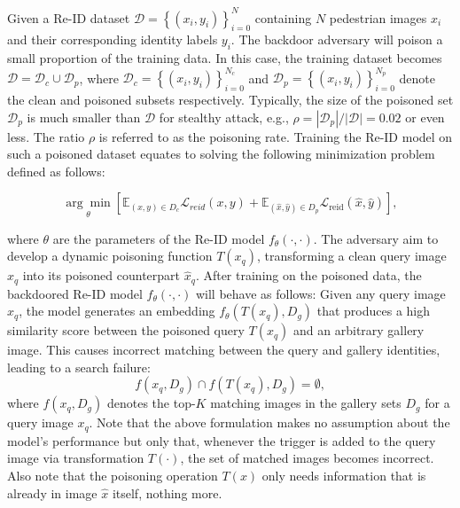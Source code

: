 \documentclass[sigconf,authordraft]{acmart}
\begin{document}
Given a Re-ID dataset $\mathcal{D}=\left\{\left(x_i, y_i\right)\right\}_{i=0}^{N}$ containing $N$ pedestrian images $x_i$ and their corresponding identity labels $y_i$. The backdoor adversary will poison a small proportion of the training data. In this case, the training dataset becomes $\mathcal{D} = \mathcal{D}_c \cup \mathcal{D}_p$, where $\mathcal{D}_c=\left\{\left(x_i, y_i\right)\right\}_{i=0}^{N_c}$ and $\mathcal{D}_p=\left\{\left(x_i, y_i\right)\right\}_{i=0}^{N_p}$ denote the clean and poisoned subsets respectively. Typically, the size of the poisoned set $\mathcal{D}_p$ is much smaller than $\mathcal{D}$ for stealthy attack, e.g., $\rho=|\mathcal{D}_p|/|\mathcal{D}|=0.02$ or even less. The ratio $\rho$ is referred to as the poisoning rate. Training the Re-ID model on such a poisoned dataset equates to solving the following minimization problem defined as follows:
\begin{small}
    \begin{equation}
\underset{\theta}{\arg \min }\left[\mathbb{E}_{(x, y) \in D_c} \mathcal{L}_{reid}(x, y)+\mathbb{E}_{(\hat{x}, \hat{y}) \in D_p} \mathcal{L}_{\text {reid}}(\hat{x}, \hat{y})\right],
\end{equation} 
\end{small}
where $\theta$ are the parameters of the Re-ID model $f_\theta(\cdot, \cdot)$. 
The adversary aim to develop a dynamic poisoning function $T(x_q)$, transforming a clean query image $x_q$ into its poisoned counterpart $\hat{x}_q$. After training on the poisoned data, the backdoored Re-ID model $f_\theta(\cdot, \cdot)$ will behave as follows: Given any query image $x_q$, the model generates an embedding $f_\theta(T(x_q), D_g)$ that produces a high similarity score between the poisoned query $T(x_q)$ and an arbitrary gallery image. This causes incorrect matching between the query and gallery identities, leading to a search failure:
\begin{equation}
    f\left(x_q, D_g\right) \cap f\left(T\left(x_q\right), D_g\right)=\emptyset,
\end{equation}
where $f\left(x_q, D_g\right)$ denotes the top-$K$ matching images in the gallery sets $D_{g}$ for a query image $x_q$. 
Note that the above formulation makes no assumption about the model's performance but only that, whenever the trigger is added to the query image via transformation $T(\cdot)$, the set of matched images becomes incorrect. Also note that the poisoning operation $T(x)$ only needs information that is already in image $\hat{x}$ itself, nothing more.
\end{document}
